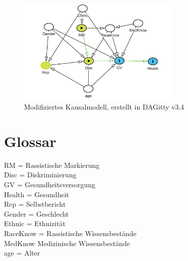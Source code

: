 \documentclass[
  11pt,
  oneside]{article}
\begin{document}
\begin{figure}
\centering
\includegraphics[width=3.125in,height=\textheight]{dagitty-model (6).png}
\caption{Modifiziertes Kausalmodell, erstellt in DAGitty v3.4}
\end{figure}

\hypertarget{glossar}{%
\section{Glossar}\label{glossar}}

RM = Rassistische Markierung\\
Disc = Diskriminierung\\
GV = Gesundheitsversorgung\\
Health = Gesundheit\\
Rep = Selbstbericht\\
Gender = Geschlecht\\
Ethnic = Ethnizität\\
RaceKnow = Rassistische Wissensbestände\\
MedKnow Medizinische Wissensbestände\\
age = Alter

  
\end{document}
